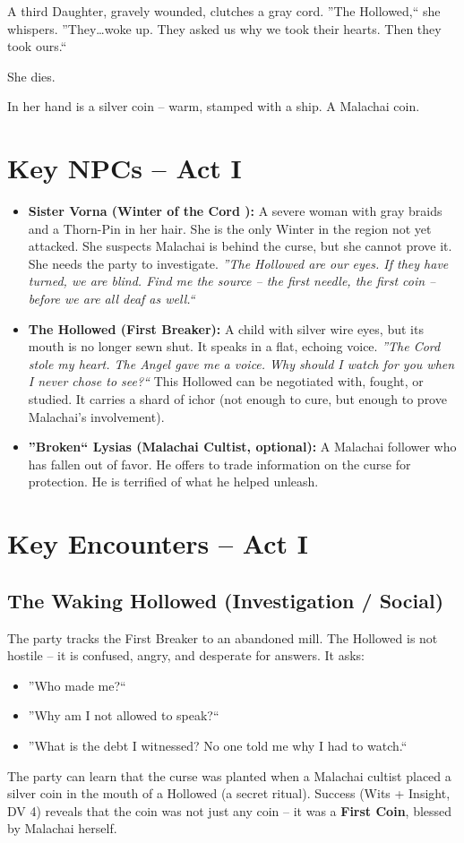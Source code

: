 \documentclass[10pt,twoside]{book}
\begin{document}
A third Daughter, gravely wounded, clutches a gray cord. ''The Hollowed,`` she whispers. ''They\dots woke up. They asked us why we took their hearts. Then they took ours.``

She dies.

In her hand is a silver coin -- warm, stamped with a ship. A Malachai coin.

\section{Key NPCs -- Act I}
\begin{itemize}
\item \textbf{Sister Vorna (Winter of the Cord ):} A severe woman with gray braids and a Thorn-Pin in her hair. She is the only Winter in the region not yet attacked. She suspects Malachai is behind the curse, but she cannot prove it. She needs the party to investigate. \textit{''The Hollowed are our eyes. If they have turned, we are blind. Find me the source -- the first needle, the first coin -- before we are all deaf as well.``}
\item \textbf{The Hollowed (First Breaker):} A child with silver wire eyes, but its mouth is no longer sewn shut. It speaks in a flat, echoing voice. \textit{''The Cord stole my heart. The Angel gave me a voice. Why should I watch for you when I never chose to see?``} This Hollowed can be negotiated with, fought, or studied. It carries a shard of ichor (not enough to cure, but enough to prove Malachai's involvement).
\item \textbf{''Broken`` Lysias (Malachai Cultist, optional):} A Malachai follower who has fallen out of favor. He offers to trade information on the curse for protection. He is terrified of what he helped unleash.
\end{itemize}

\section{Key Encounters -- Act I}

\subsection{The Waking Hollowed (Investigation / Social)}
The party tracks the First Breaker to an abandoned mill. The Hollowed is not hostile -- it is confused, angry, and desperate for answers. It asks:
\begin{itemize}
\item ''Who made me?``
\item ''Why am I not allowed to speak?``
\item ''What is the debt I witnessed? No one told me why I had to watch.``
\end{itemize}
The party can learn that the curse was planted when a Malachai cultist placed a silver coin in the mouth of a Hollowed (a secret ritual). Success (Wits + Insight, DV 4) reveals that the coin was not just any coin -- it was a \textbf{First Coin}, blessed by Malachai herself.
\end{document}
